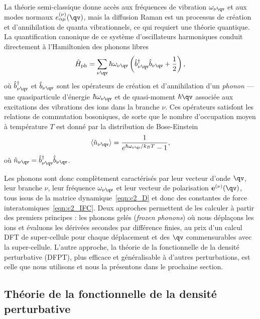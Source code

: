 La théorie semi-classique donne accès aux fréquences de vibration $\omega_{\nu\qv}$ et aux modes 
normaux $e_{\alpha\mu}^{(\nu)}(\qv)$, mais la diffusion Raman est un processus de création et d'annihilation de quanta vibrationnels, ce qui requiert une théorie quantique. La quantification canonique de ce système d'oscillateurs harmoniques conduit directement à l'Hamiltonien des phonons libres
\begin{equation}
    \hat{H}_\text{ph}=\sum_{\nu\qv}\hbar\omega_{\nu\qv}\left(\hat{b}_{\nu\qv}^\dag \hat{b}_{\nu\qv}+\frac{1}{2}\right),
\end{equation}
où $\hat{b}^\dag_{\nu\qv}$ et $\hat{b}_{\nu\qv}$ sont les opérateurs de création et d'annihilation d'un \textit{phonon} --- une quasiparticule d'énergie $\hbar\omega_{\nu\qv}$ et de quasi-moment $\hbar\qv$ associée aux excitations des vibrations des ions dans la branche $\nu$. Ces opérateurs satisfont les relations de commutation bosoniques, de sorte que le nombre d'occupation moyen à température $T$ est donné par la distribution de Bose-Einstein
\begin{equation}
    \langle\hat{n}_{\nu\qv}\rangle = \frac{1}{e^{\hbar\omega_{\nu\qv}/k_BT}-1},
\end{equation}
où $\hat{n}_{\nu\qv}=\hat{b}^\dag_{\nu\qv}\hat{b}_{\nu\qv}$. 

Les phonons sont donc complètement caractérisés par leur vecteur d'onde $\qv$, leur branche $\nu$, leur fréquence $\omega_{\nu\qv}$ et leur vecteur de polarisation $\mathbf{e}^{(\nu)}(\qv)$, tous issus de la matrice dynamique~\eqref{eqn:c2_D} et donc des constantes de force interatomiques~\eqref{eqn:c2_IFC}. Deux approches permettent de les calculer à partir des premiers principes : les phonons gelés (\textit{frozen phonons}) où nous déplaçons les ions et évaluons les dérivées secondes par différence finies, au prix d'un calcul DFT de super-cellule pour chaque déplacement et des $\qv$ commensurables avec la super-cellule. L'autre approche, la théorie de la fonctionnelle de la densité perturbative (DFPT), plus efficace et généralisable à d'autres perturbations, est celle que nous utilisons et nous la présentons dans le prochaine section.

\subsection{Théorie de la fonctionnelle de la densité perturbative}\label{sec:dfpt}

